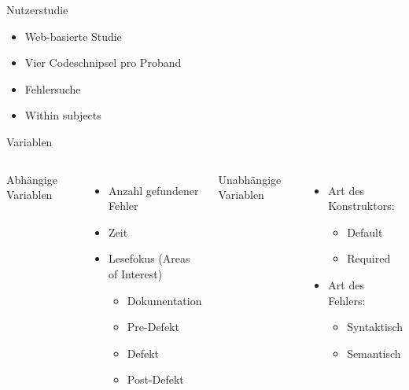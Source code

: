 \documentclass[10pt]{beamer}
\begin{document}
	\begin{frame}{Nutzerstudie}
		\begin{itemize}
			\item Web-basierte Studie\\
			\vspace{\baselineskip}
			\item Vier Codeschnipsel pro Proband\\
			\vspace{\baselineskip}
			\item Fehlersuche\\
			\vspace{\baselineskip}
			\item Within subjects
		\end{itemize}
	\end{frame}

	\begin{frame}{Variablen}
		\begin{columns}[T,onlytextwidth]
	
			Abhängige Variablen
			\begin{itemize}
				\item Anzahl gefundener Fehler
				\item Zeit
				\item Lesefokus (Areas of Interest)
				\begin{itemize}
					\item Dokumentation
					\item Pre-Defekt
					\item Defekt
					\item Post-Defekt
				\end{itemize}
			\end{itemize}
		
			Unabhängige Variablen
			\begin{itemize}
				\item Art des Konstruktors:
				\begin{itemize}
					\item Default
					\item Required
				\end{itemize}
				\item Art des Fehlers:
				\begin{itemize}
					\item Syntaktisch
					\item Semantisch
				\end{itemize}
			\end{itemize}
		\end{columns}	
	\end{frame}
\end{document}
